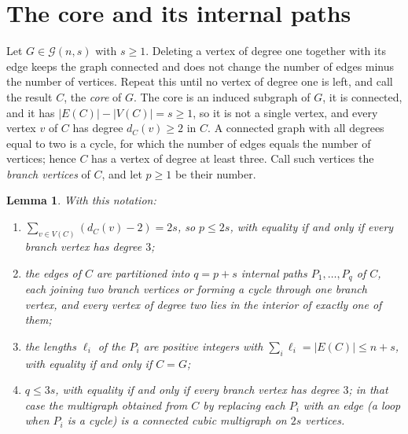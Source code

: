 \documentclass[11pt]{article}
\newtheorem{lemma}[theorem]{Lemma}
\theoremstyle{definition}
\theoremstyle{remark}
\newcommand{\G}{\mathcal{G}}
\begin{document}
\section{The core and its internal paths}\label{sec:core}

Let $G\in\G(n,s)$ with $s\ge1$. Deleting a vertex of degree one together with its edge keeps the graph connected and
does not change the number of edges minus the number of vertices. Repeat this until no vertex of degree one is left,
and call the result $C$, the \emph{core} of $G$. The core is an induced subgraph of $G$, it is connected, and it has
$|E(C)|-|V(C)|=s\ge1$, so it is not a single vertex, and every vertex $v$ of $C$ has degree $d_C(v)\ge2$ in $C$. A connected
graph with all degrees equal to two is a cycle, for which the number of edges equals the number of vertices; hence $C$
has a vertex of degree at least three. Call such vertices the \emph{branch vertices} of $C$, and let $p\ge1$ be their
number.

\begin{lemma}\label{lem:core}
With this notation:
\begin{enumerate}[label=(\alph*)]
\item $\sum_{v\in V(C)}(d_C(v)-2)=2s$, so $p\le2s$, with equality if and only if every branch vertex has degree $3$;
\item the edges of $C$ are partitioned into $q=p+s$ internal paths $P_1,\dots,P_q$ of $C$, each joining two branch
vertices or forming a cycle through one branch vertex, and every vertex of degree two lies in the interior of exactly
one of them;
\item the lengths $\ell_i$ of the $P_i$ are positive integers with $\sum_i\ell_i=|E(C)|\le n+s$, with equality if and only
if $C=G$;
\item $q\le3s$, with equality if and only if every branch vertex has degree $3$; in that case the multigraph obtained
from $C$ by replacing each $P_i$ with an edge (a loop when $P_i$ is a cycle) is a connected cubic multigraph on $2s$
vertices.
\end{enumerate}
\end{lemma}
\end{document}

